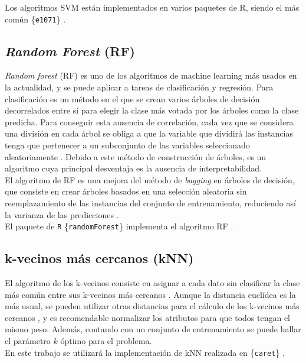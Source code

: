 Los algoritmos SVM están implementados en varios paquetes de R, siendo el más común \{\texttt{e1071}\} \cite{Meyer2019}.

\subsection{\textit{Random Forest} (RF)}

\textit{Random forest} (RF) es uno de los algoritmos de machine learning más usados en la actualidad, y se puede aplicar a tareas de clasificación y regresión. Para clasificación es un método en el que se crean varios árboles de decisión decorrelados entre sí para elegir la clase más votada por los árboles como la clase predicha. Para conseguir esta ausencia de correlación, cada vez que se considera una división en cada árbol se obliga a que la variable que dividirá las instancias tenga que pertenecer a un subconjunto de las variables seleccionado aleatoriamente \cite{Breiman2001, Breiman2002}. Debido a este método de construcción de árboles, es un algoritmo cuya principal desventaja es la ausencia de interpretabilidad.\\

El algoritmo de RF es una mejora del método de \textit{bagging} en árboles de decisión, que consiste en crear árboles basados en una selección aleatoria sin reemplazamiento de las instancias del conjunto de entrenamiento, reduciendo así la varianza de las predicciones \cite{Breiman1996}.\\

El paquete de \texttt{R} \{\texttt{randomForest}\} implementa el algoritmo RF \cite{Liaw2002}.

\subsection{k-vecinos más cercanos (kNN)}

El algoritmo de los k-vecinos consiste en asignar a cada dato sin clasificar la clase más común entre sus k-vecinos más cercanos \cite{Altman1992}. Aunque la distancia euclídea es la más usual, se pueden utilizar otras distancias para el cálculo de los k-vecinos más cercanos \cite{Hu2016}, y es recomendable normalizar los atributos para que todos tengan el mismo peso. Además, contando con un conjunto de entrenamiento se puede hallar el parámetro $k$ óptimo para el problema.\\

En este trabajo se utilizará la implementación de kNN realizada en \{\texttt{caret}\} \cite{Kuhn2020}.

